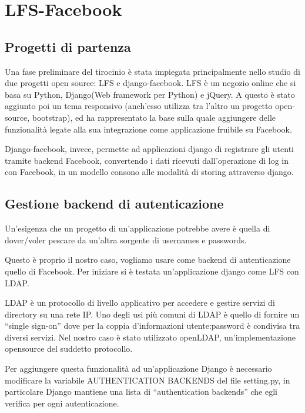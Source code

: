\chapter{LFS-Facebook}
 
\section{Progetti di partenza}
Una fase preliminare del tirocinio è stata impiegata principalmente nello studio di due progetti open source: LFS e django-facebook.
LFS è un negozio online che  si basa su Python, Django(Web framework per Python) e jQuery. A questo è stato aggiunto poi un tema responsivo (anch'esso utilizza tra l'altro un progetto open-source, bootstrap), ed ha rappresentato la base sulla quale aggiungere delle funzionalità legate alla sua integrazione come applicazione fruibile su Facebook. 

Django-facebook, invece, permette ad applicazioni django di registrare gli utenti tramite backend Facebook, convertendo i dati ricevuti dall'operazione di log in con Facebook, in un modello consono alle modalità di storing attraverso django.

\section{Gestione backend di autenticazione}
Un'esigenza che un progetto di un'applicazione potrebbe avere è quella di dover/voler pescare da un'altra sorgente di usernames e passwords.

Questo è proprio il nostro caso, vogliamo usare come backend di autenticazione quello di Facebook.
Per iniziare si è testata un'applicazione django come LFS con LDAP. 

LDAP è un protocollo di livello applicativo per accedere e gestire servizi di directory su una rete IP. Uno degli usi più comuni di LDAP è quello di fornire un “single sign-on” dove per la coppia d'informazioni utente:password è condivisa tra diversi servizi.
Nel nostro caso è stato utilizzato openLDAP, un'implementazione opensource del suddetto protocollo.

Per aggiungere questa funzionalità ad un'applicazione Django è necessario modificare la variabile AUTHENTICATION BACKENDS del file setting.py, in particolare Django mantiene una lista di “authentication backends” che egli verifica per ogni autenticazione. 


